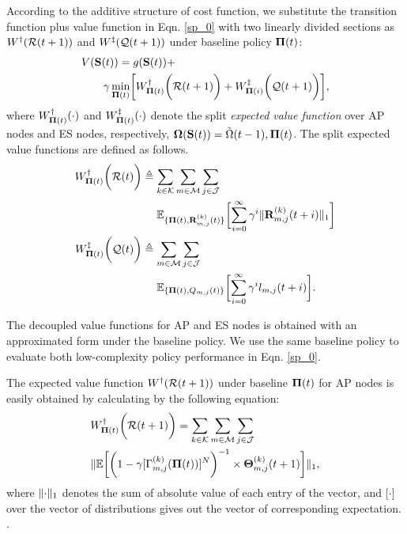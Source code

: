 According to the additive structure of cost function, we substitute the transition function plus value function in Eqn. \ref{sp_0} with two linearly divided sections as $W^{\dagger}(\mathcal{R}({t+1}))$ and $W^{\ddagger}(\mathcal{Q}({t+1}))$ under baseline policy $\boldsymbol{\Pi}({t})$:
\begin{align}
    &V(\Stat({t})) = g(\Stat({t})) +
    \nonumber\\
    &~~~~~~\gamma \min_{\BaseLine({t})} \Bracket{ W^{\AP}_{\BaseLine({t})}\Paren{\mathcal{R}({t+1})} + W^{\ES}_{\BaseLine({i})}\Paren{\mathcal{Q}({t+1})} },
\end{align}
where $W^{\dagger}_{\boldsymbol{\Pi}({t})}(\cdot)$ and $W^{\ddagger}_{\boldsymbol{\Pi}({t})}(\cdot)$ denote the split \emph{expected value function} over AP nodes and ES nodes, respectively, $\boldsymbol{\Omega}(\mathbf{S}({t})) = \tilde{\Omega}({t-1}), \boldsymbol{\Pi}({t})$. The split expected value functions are defined as follows.
\begin{align}
    W^{\AP}_{\BaseLine({t})}\Paren{\mathcal{R}({t})}
        &\define \sum_{k\in\apSet}\sum_{m\in\esSet}\sum_{j\in\jSpace}
        \nonumber\\
        &~~~~\mathbb{E}_{\{\BaseLine({t}), \vec{R}^{(k)}_{m,j}({t})\}}\Bracket{
            \sum_{i=0}^{\infty} \gamma^{i} \Inorm{\vec{R}^{(k)}_{m,j}({t+i})}
        }
    \\
    W^{\ES}_{\BaseLine({t})}\Paren{\mathcal{Q}({t})}
        &\define \sum_{m\in\esSet}\sum_{j\in\jSpace}
        \nonumber\\
        &~~~~\mathbb{E}_{\{\BaseLine({t}), Q_{m,j}({t})\}}\Bracket{
            \sum_{i=0}^{\infty} \gamma^{i} l_{m,j}({t+i})
        }.
\end{align}
        
The decoupled value functions for AP and ES nodes is obtained with an approximated form under the baseline policy. We use the same baseline policy to evaluate both low-complexity policy performance in Eqn. \ref{sp_0}.

The expected value function $W^{\dagger}(\mathcal{R}({t+1}))$ under baseline $\boldsymbol{\Pi}({t})$ for AP nodes is easily obtained by calculating by the following equation:
\begin{align}
    &W^{\dagger}_{\boldsymbol{\Pi}({t})}\bigg(\mathcal{R}({t+1})\bigg) = \sum_{k\in\mathcal{K}}\sum_{m\in\mathcal{M}}\sum_{j\in\mathcal{J}}
    \nonumber\\
    & \lVert
        \mathbb{E}\bigg[
            \bigg(
                1 - \gamma [\Gamma^{(k)}_{m,j}(\boldsymbol{\Pi}({t}))]^{N}
            \bigg)^{-1} \times \boldsymbol{\Theta}^{(k)}_{m,j}({t+1})
        \bigg]
    \|_1,
    \label{w_ap}
\end{align}
where $\lVert\cdot\|_1$ denotes the sum of absolute value of each entry of the vector, and $\mathbb[\cdot]$ over the vector of distributions gives out the vector of corresponding expectation. .

